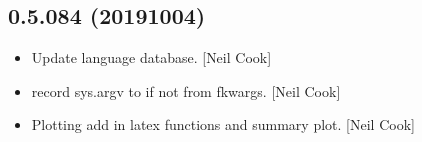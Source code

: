 \documentclass[a4paper,10pt,english]{report}
\begin{document}
\subsection{0.5.084 (2019\sphinxhyphen{}10\sphinxhyphen{}04)}
\label{\detokenize{misc/changelog:id78}}\begin{itemize}
\item {} 
Update language database. {[}Neil Cook{]}

\item {} 
 \sphinxhyphen{} record sys.argv to  if not
from fkwargs. {[}Neil Cook{]}

\item {} 
Plotting \sphinxhyphen{} add in latex functions and summary plot. {[}Neil Cook{]}

\end{itemize}
\end{document}
